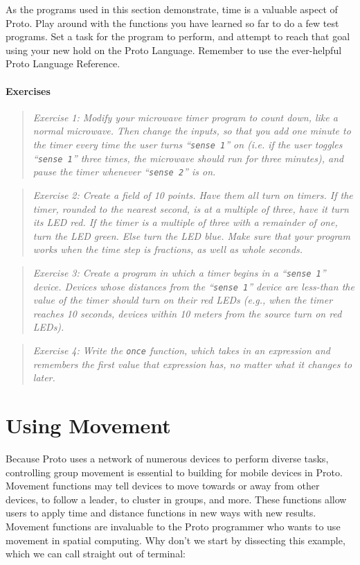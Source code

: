 \documentclass{article}
\newcommand\problem[1]{\begin{quote}{\em #1}\end{quote}}
\newcommand\var[1]{{\tt #1}}
\newcommand\qvar[1]{``{\tt #1}''}
\begin{document}
As the programs used in this section demonstrate, time is a valuable
aspect of Proto.  Play around with the functions you have learned so
far to do a few test programs.  Set a task for the program to perform,
and attempt to reach that goal using your new hold on the Proto
Language.  Remember to use the ever-helpful Proto Language Reference.

\paragraph{Exercises}

\problem{Exercise 1: Modify your microwave timer program to count
  down, like a normal microwave.  Then change the inputs, so that you
  add one minute to the timer every time the user turns \qvar{sense 1}
  on (i.e. if the user toggles \qvar{sense 1} three times, the
  microwave should run for three minutes), and pause the timer
  whenever \qvar{sense 2} is on.}

\problem{Exercise 2: Create a field of 10 points. Have them all turn
  on timers.  If the timer, rounded to the nearest second, is at a
  multiple of three, have it turn its LED red.  If the timer is a
  multiple of three with a remainder of one, turn the LED green.  Else
  turn the LED blue.  Make sure that your program works when the time
  step is fractions, as well as whole seconds.}

\problem{Exercise 3: Create a program in which a timer begins in a
  \qvar{sense 1} device.  Devices whose distances from the \qvar{sense 1}
  device are less-than the value of the timer should turn on their red LEDs
  (e.g., when the timer reaches 10 seconds, devices within 10 meters from
  the source turn on red LEDs).}

\problem{Exercise 4: Write the \var{once} function, which takes in
  an expression and remembers the first value that expression has,
  no matter what it changes to later.}


\section{Using Movement}
\label{s:move}

Because Proto uses a network of numerous devices to perform diverse
tasks, controlling group movement is essential to building for mobile
devices in Proto.  Movement functions may tell devices to move
towards or away from other devices, to follow a leader, to cluster in
groups, and more.  These functions allow users to apply time and
distance functions in new ways with new results. Movement functions
are invaluable to the Proto programmer who wants to use movement in
spatial computing.  Why don't we start by dissecting this example,
which we can call straight out of terminal:
\end{document}
